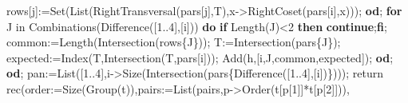 \documentclass[
  10pt,
  letterpaper,
]{article}
\newenvironment{Shaded}{}{}
\newcommand{\BuiltInTok}[1]{\textcolor[rgb]{0.00,0.50,0.00}{#1}}
\newcommand{\ControlFlowTok}[1]{\textcolor[rgb]{0.00,0.44,0.13}{\textbf{#1}}}
\newcommand{\ExtensionTok}[1]{#1}
\newcommand{\FloatTok}[1]{\textcolor[rgb]{0.25,0.63,0.44}{#1}}
\newcommand{\NormalTok}[1]{#1}
\newcommand{\OperatorTok}[1]{\textcolor[rgb]{0.40,0.40,0.40}{#1}}
\newcommand{\VariableTok}[1]{\textcolor[rgb]{0.10,0.09,0.49}{#1}}
\begin{document}
\begin{Shaded}
\begin{Highlighting}[]
   \VariableTok{rows}\NormalTok{[}\VariableTok{j}\NormalTok{]}\OperatorTok{:=}\BuiltInTok{Set}\NormalTok{(}\BuiltInTok{List}\NormalTok{(}\BuiltInTok{RightTransversal}\NormalTok{(}\VariableTok{pars}\NormalTok{[}\VariableTok{j}\NormalTok{]}\OperatorTok{,}\VariableTok{T}\NormalTok{)}\OperatorTok{,}\VariableTok{x}\OperatorTok{{-}\textgreater{}}\BuiltInTok{RightCoset}\NormalTok{(}\VariableTok{pars}\NormalTok{[}\VariableTok{i}\NormalTok{]}\OperatorTok{,}\VariableTok{x}\NormalTok{)))}\OperatorTok{;}
  \ControlFlowTok{od}\OperatorTok{;}
  \ControlFlowTok{for} \VariableTok{J} \ExtensionTok{in} \BuiltInTok{Combinations}\NormalTok{(}\BuiltInTok{Difference}\NormalTok{([}\FloatTok{1}\OperatorTok{..}\FloatTok{4}\NormalTok{]}\OperatorTok{,}\NormalTok{[}\VariableTok{i}\NormalTok{])) }\ControlFlowTok{do}
   \ControlFlowTok{if} \BuiltInTok{Length}\NormalTok{(}\VariableTok{J}\NormalTok{)}\OperatorTok{\textless{}}\FloatTok{2} \ControlFlowTok{then} \ControlFlowTok{continue}\OperatorTok{;}\ControlFlowTok{fi}\OperatorTok{;}
   \VariableTok{common}\OperatorTok{:=}\BuiltInTok{Length}\NormalTok{(}\BuiltInTok{Intersection}\NormalTok{(}\VariableTok{rows}\NormalTok{\{}\VariableTok{J}\NormalTok{\}))}\OperatorTok{;} \VariableTok{T}\OperatorTok{:=}\BuiltInTok{Intersection}\NormalTok{(}\VariableTok{pars}\NormalTok{\{}\VariableTok{J}\NormalTok{\})}\OperatorTok{;}
   \VariableTok{expected}\OperatorTok{:=}\BuiltInTok{Index}\NormalTok{(}\VariableTok{T}\OperatorTok{,}\BuiltInTok{Intersection}\NormalTok{(}\VariableTok{T}\OperatorTok{,}\VariableTok{pars}\NormalTok{[}\VariableTok{i}\NormalTok{]))}\OperatorTok{;}
   \BuiltInTok{Add}\NormalTok{(}\VariableTok{h}\OperatorTok{,}\NormalTok{[}\VariableTok{i}\OperatorTok{,}\VariableTok{J}\OperatorTok{,}\VariableTok{common}\OperatorTok{,}\VariableTok{expected}\NormalTok{])}\OperatorTok{;}
  \ControlFlowTok{od}\OperatorTok{;}
 \ControlFlowTok{od}\OperatorTok{;}
 \VariableTok{pan}\OperatorTok{:=}\BuiltInTok{List}\NormalTok{([}\FloatTok{1}\OperatorTok{..}\FloatTok{4}\NormalTok{]}\OperatorTok{,}\VariableTok{i}\OperatorTok{{-}\textgreater{}}\BuiltInTok{Size}\NormalTok{(}\BuiltInTok{Intersection}\NormalTok{(}\VariableTok{pars}\NormalTok{\{}\BuiltInTok{Difference}\NormalTok{([}\FloatTok{1}\OperatorTok{..}\FloatTok{4}\NormalTok{]}\OperatorTok{,}\NormalTok{[}\VariableTok{i}\NormalTok{])\})))}\OperatorTok{;}
 \ExtensionTok{return} \ExtensionTok{rec}\NormalTok{(}\VariableTok{order}\OperatorTok{:=}\BuiltInTok{Size}\NormalTok{(}\BuiltInTok{Group}\NormalTok{(}\VariableTok{t}\NormalTok{))}\OperatorTok{,}\VariableTok{pairs}\OperatorTok{:=}\BuiltInTok{List}\NormalTok{(}\VariableTok{pairs}\OperatorTok{,}\VariableTok{p}\OperatorTok{{-}\textgreater{}}\BuiltInTok{Order}\NormalTok{(}\VariableTok{t}\NormalTok{[}\VariableTok{p}\NormalTok{[}\FloatTok{1}\NormalTok{]]}\OperatorTok{*}\VariableTok{t}\NormalTok{[}\VariableTok{p}\NormalTok{[}\FloatTok{2}\NormalTok{]]))}\OperatorTok{,}

\end{Highlighting}
\end{Shaded}
\end{document}
